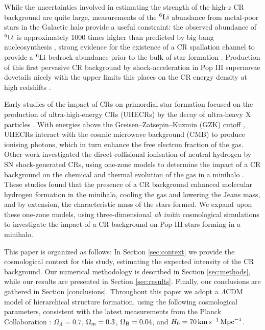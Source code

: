 \documentclass[usenatbib]{mn2e}
\newcommand{\kms}{\,\mathrm{km}\,\mathrm{s}^{-1}}
\newcommand{\Mpc}{\,{\rm Mpc}}
\begin{document}
While the uncertainties involved in estimating the strength of the high-$z$  CR background are quite large,  measurements of the $^6{\rm Li}$ abundance from metal-poor stars in the Galactic halo provide a useful constraint: the observed abundance of  $^6{\rm Li}$ is approximately 1000 times higher than predicted by big bang nucleosynthesis \citep{Asplundetal2006}, strong evidence for the existence of a CR spallation channel to provide a $^6{\rm Li}$ bedrock abundance prior to the bulk of star formation \citep{RollindeVangioniOlive2005,RollindeVangioniOlive2006}. 
Production of this first pervasive CR background by shock-acceleration in Pop III supernovae dovetails nicely with the upper limits this places on the CR energy density at high redshifts \citep{RollindeVangioniOlive2006}.

Early studies of the impact of CRs on primordial star formation focused on the production of ultra-high-energy CRs (UHECRs) by the decay of ultra-heavy X particles \citep{ShchekinovVasiliev2004,VasilievShchekinov2006,RipamontiMapelliFerrara2007}.  
With energies above the Greisen--Zatsepin--Kuzmin (GZK) cutoff \citep{Greisen1966,ZatsepinKuzmin1966}, UHECRs interact with the cosmic microwave background (CMB) to produce ionising photons, which in turn enhance the free electron fraction of the gas.  
Other work investigated the direct collisional ionisation of neutral hydrogen by SN shock-generated CRs, using one-zone models to determine the impact of a CR background on the chemical and thermal evolution of the gas in a minihalo \citep{StacyBromm2007,JascheCiardiEnsslin2007}.  
These studies found that the presence of a CR background enhanced molecular hydrogen formation in the minihalo, cooling the gas and lowering the Jeans mass, and by extension, the characteristic mass of the stars formed. 
We expand upon these one-zone models, using three-dimensional \textit{ab initio} cosmological simulations to investigate the impact of a CR background on Pop III stars forming in a minihalo.

This paper is organized as follows: In Section \ref{sec:context} we provide the cosmological context for this study, estimating the expected intensity of the CR background. Our numerical methodology is described in Section \ref{sec:methods}, while our results are presented in Section \ref{sec:results}.  
Finally, our conclusions are gathered in Section \ref{conclusions}. Throughout this paper we adopt a $\Lambda$CDM model of hierarchical structure formation, using the following cosmological parameters, consistent with the latest measurements from the Planck Collaboration \citep{PlanckParams2015}: $\Omega_{\Lambda} = 0.7$, $\Omega_{\rm m} = 0.3$, $\Omega_{\rm B} = 0.04$, and $H_0 = 70 \kms \Mpc^{-1}$.
\end{document}

